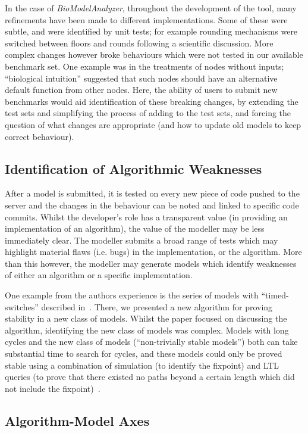 \documentclass[conference]{IEEEtran}
\begin{document}
In the case of {\emph{BioModelAnalyzer}}, throughout the development of the
tool, many refinements have been made to different
implementations. Some of these were subtle, and were identified by
unit tests; for example rounding mechanisms were switched between
floors and rounds following a scientific discussion. More complex
changes however broke behaviours which were not tested in our
available benchmark set. One example was in the treatments of nodes
without inputs; ``biological intuition'' suggested that such nodes
should have an alternative default function from other nodes. Here,
the ability of users to submit new benchmarks would aid identification
of these breaking changes, by extending the test sets and simplifying
the process of adding to the test sets, and forcing the question of
what changes are appropriate (and how to update old models to keep
correct behaviour).


\subsection{Identification of Algorithmic Weaknesses}

After a model is submitted, it is tested on every new piece of code
pushed to the server and the changes in the behaviour can be noted and
linked to specific code commits. Whilst the developer's role has a
transparent value (in providing an implementation of an algorithm),
the value of the modeller may be less immediately clear. The modeller
submits a broad range of tests which may highlight material flaws
(i.e. bugs) in the implementation, or the algorithm. More than this
however, the modeller may generate models which identify weaknesses of
either an algorithm or a specific implementation.

One example from the authors experience is the series of models with
``timed-switches'' described in~\cite{cook-et-al:2014}. There, we
presented a new algorithm for proving stability in a new class of
models. Whilst the paper focused on discussing the algorithm,
identifying the new class of models was complex. Models with long
cycles and the new class of models (``non-trivially stable models'')
both can take substantial time to search for cycles, and these models
could only be proved stable using a combination of simulation (to
identify the fixpoint) and LTL queries (to prove that there existed
no paths beyond a certain length which did not include the
fixpoint)~\cite{claessen-et-al:2013}.

\subsection{Algorithm-Model Axes}
\end{document}
